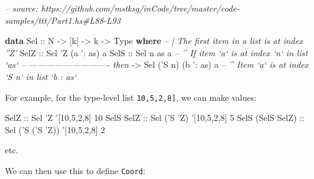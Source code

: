 \documentclass[]{article}
\newenvironment{Shaded}{}{}
\newcommand{\CommentTok}[1]{\textcolor[rgb]{0.38,0.63,0.69}{\textit{#1}}}
\newcommand{\DataTypeTok}[1]{\textcolor[rgb]{0.56,0.13,0.00}{#1}}
\newcommand{\DecValTok}[1]{\textcolor[rgb]{0.25,0.63,0.44}{#1}}
\newcommand{\FunctionTok}[1]{\textcolor[rgb]{0.02,0.16,0.49}{#1}}
\newcommand{\KeywordTok}[1]{\textcolor[rgb]{0.00,0.44,0.13}{\textbf{#1}}}
\newcommand{\NormalTok}[1]{#1}
\newcommand{\OtherTok}[1]{\textcolor[rgb]{0.00,0.44,0.13}{#1}}
\begin{document}
\begin{Shaded}
\begin{Highlighting}[]
\CommentTok{-- source: https://github.com/mstksg/inCode/tree/master/code-samples/ttt/Part1.hs#L88-L93}

\KeywordTok{data} \DataTypeTok{Sel}\OtherTok{ ::} \DataTypeTok{N} \OtherTok{->}\NormalTok{ [k] }\OtherTok{->}\NormalTok{ k }\OtherTok{->} \DataTypeTok{Type} \KeywordTok{where}
    \CommentTok{-- | The first item in a list is at index ''Z'}
    \DataTypeTok{SelZ}\OtherTok{ ::} \DataTypeTok{Sel}\NormalTok{ '}\DataTypeTok{Z}\NormalTok{ (a '}\FunctionTok{:}\NormalTok{ as) a}
    \DataTypeTok{SelS}\OtherTok{ ::} \DataTypeTok{Sel}\NormalTok{     n        as  a  }\CommentTok{-- ^ If item `a` is at index `n` in list `as`}
         \CommentTok{-- ---------------------------- then}
         \OtherTok{->} \DataTypeTok{Sel}\NormalTok{ ('}\DataTypeTok{S}\NormalTok{ n) (b '}\FunctionTok{:}\NormalTok{ as) a  }\CommentTok{-- ^ Item `a` is at index `S n` in list `b : as`}
\end{Highlighting}
\end{Shaded}

For example, for the type-level list \texttt{\textquotesingle{}{[}10,5,2,8{]}},
we can make values:

\begin{Shaded}
\begin{Highlighting}[]
\DataTypeTok{SelZ}\OtherTok{             ::} \DataTypeTok{Sel}\NormalTok{         '}\DataTypeTok{Z}\NormalTok{   '[}\DecValTok{10}\NormalTok{,}\DecValTok{5}\NormalTok{,}\DecValTok{2}\NormalTok{,}\DecValTok{8}\NormalTok{] }\DecValTok{10}
\DataTypeTok{SelS} \DataTypeTok{SelZ}\OtherTok{        ::} \DataTypeTok{Sel}\NormalTok{     ('}\DataTypeTok{S}\NormalTok{ '}\DataTypeTok{Z}\NormalTok{)  '[}\DecValTok{10}\NormalTok{,}\DecValTok{5}\NormalTok{,}\DecValTok{2}\NormalTok{,}\DecValTok{8}\NormalTok{] }\DecValTok{5}
\DataTypeTok{SelS}\NormalTok{ (}\DataTypeTok{SelS} \DataTypeTok{SelZ}\NormalTok{)}\OtherTok{ ::} \DataTypeTok{Sel}\NormalTok{ ('}\DataTypeTok{S}\NormalTok{ ('}\DataTypeTok{S}\NormalTok{ '}\DataTypeTok{Z}\NormalTok{)) '[}\DecValTok{10}\NormalTok{,}\DecValTok{5}\NormalTok{,}\DecValTok{2}\NormalTok{,}\DecValTok{8}\NormalTok{] }\DecValTok{2}
\end{Highlighting}
\end{Shaded}

etc.

We can then use this to define \texttt{Coord}:
\end{document}
